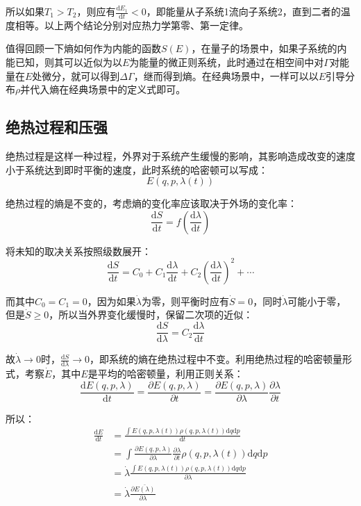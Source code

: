 \documentclass[UTF8]{ctexart}
\begin{document}
\begin{spacing}{2.0}
所以如果$T_{1}>T_{2}$，则应有$\frac{\text{d}E_{1}}{\text{d} t}<0$，即能量从子系统1流向子系统2，直到二者的温度相等。以上两个结论分别对应热力学第零、第一定律。

值得回顾一下熵如何作为内能的函数$S(E)$，在量子的场景中，如果子系统的内能已知，则其可以近似为以$E$为能量的微正则系统，此时通过在相空间中对$\Gamma$对能量在$E$处微分，就可以得到$\Delta\Gamma$，继而得到熵。在经典场景中，一样可以以$E$引导分布$\rho$并代入熵在经典场景中的定义式即可。

\subsection{绝热过程和压强}
绝热过程是这样一种过程，外界对于系统产生缓慢的影响，其影响造成改变的速度小于系统达到即时平衡的速度，此时系统的哈密顿可以写成：
\begin{equation}
E(q,p,\lambda(t))
\end{equation}

绝热过程的熵是不变的，考虑熵的变化率应该取决于外场的变化率：
\begin{equation}
\frac{\text{d}S}{\text{d}t} = f\left(\frac{\text{d}\lambda}{\text{d}t}\right)
\end{equation}

将未知的取决关系按照级数展开：
\begin{equation}
\frac{\text{d}S}{\text{d}t}=C_{0}+C_{1}\frac{\text{d}\lambda}{\text{d}t}+C_{2}\left( \frac{\text{d}\lambda}{\text{d}t}\right)^{2}+\cdots
\end{equation}

而其中$C_{0}=C_{1}=0$，因为如果$\dot{\lambda}$为零，则平衡时应有$\dot{S}=0$，同时$\dot{\lambda}$可能小于零，但是$\dot{S}\geq 0$，所以当外界变化缓慢时，保留二次项的近似：
\begin{equation}
\frac{\text{d}S}{\text{d}\lambda} = C_{2}\frac{\text{d}\lambda}{\text{d}t}
\end{equation}

故$\dot{\lambda}\rightarrow 0$时，$\frac{\text{d}S}{\text{d}\lambda} \rightarrow 0$，即系统的熵在绝热过程中不变。利用绝热过程的哈密顿量形式，考察$\dot{E}$，其中$E$是平均的哈密顿量，利用正则关系：
\begin{equation}
\frac{\text{d}E(q,p,\lambda)}{\text{d}t}=\frac{\partial E(q,p,\lambda)}{\partial t}=\frac{\partial E(q,p,\lambda)}{\partial \lambda}\frac{\partial \lambda}{\partial t}
\end{equation}

所以：
\begin{equation}
\begin{aligned}
\frac{\text{d}E}{\text{d}t}&=\frac{\int E(q,p,\lambda(t))\rho(q,p,\lambda(t))\text{d}q\text{d}p}{\text{d}t}\\
&=\int \frac{\partial E(q,p,\lambda)}{\partial \lambda}\frac{\partial \lambda}{\partial t}  \rho(q,p,\lambda(t))\text{d}q\text{d}p \\
&=\dot{\lambda} \frac{\int E(q,p,\lambda(t))\rho(q,p,\lambda(t))\text{d}q\text{d}p}{\partial \lambda}\\
&=\dot{\lambda}\frac{\partial \bar{E(\lambda)}}{\partial \lambda}
\end{aligned}
\end{equation}


\end{spacing}
\end{document}
